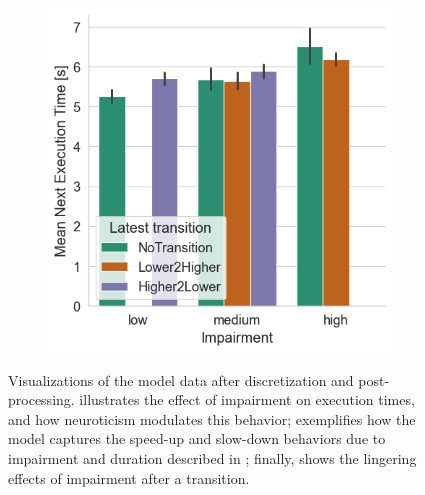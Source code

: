 \begin{figure}
\begin{subfigure}[t]{\columnwidth}
    \end{subfigure}%
    \begin{subfigure}[t]{\columnwidth}
        \centering
        \includegraphics[width=.8\columnwidth]{./model_data/impairment_transition_vs_exectime.png}
        \caption{}\label{fig:timing:imptransvsetime}
    \end{subfigure}
    \caption{%
        Visualizations of the model data after discretization and post-processing.
         illustrates the effect of impairment on execution times, and how neuroticism modulates this behavior;
         exemplifies how the model captures the speed-up and slow-down behaviors due to impairment and duration described in \textcite{olguinmunoz:impact2021};
        finally,  shows the lingering effects of impairment after a transition.
    }\label{fig:timing}
\end{figure}



